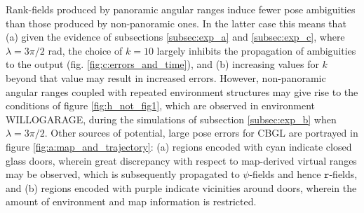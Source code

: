 Rank-fields produced by panoramic angular ranges induce fewer pose ambiguities
than those produced by non-panoramic ones. In the latter case this means that
(a) given the evidence of subsections \ref{subsec:exp_a} and
\ref{subsec:exp_c}, where $\lambda = 3\pi/2$ rad, the choice of $k=10$ largely
inhibits the propagation of ambiguities to the output (fig.
\ref{fig:c:errors_and_time}), and (b) increasing values for $k$ beyond that
value may result in increased errors. However,  non-panoramic angular ranges
coupled with repeated environment structures may give rise to the conditions of
figure \ref{fig:h_not_fig1}, which are observed in environment WILLOGARAGE,
during the simulations of subsection \ref{subsec:exp_b} when $\lambda =
3\pi/2$. Other sources of potential, large pose errors for CBGL are portrayed
in figure \ref{fig:a:map_and_trajectory}: (a) regions encoded with cyan
indicate closed glass doors, wherein great discrepancy with respect to
map-derived virtual ranges may be observed, which is subsequently propagated to
$\psi$-fields and hence $\texttt{r}$-fields, and (b) regions encoded with
purple indicate vicinities around doors, wherein the amount of environment and
map information is restricted.

